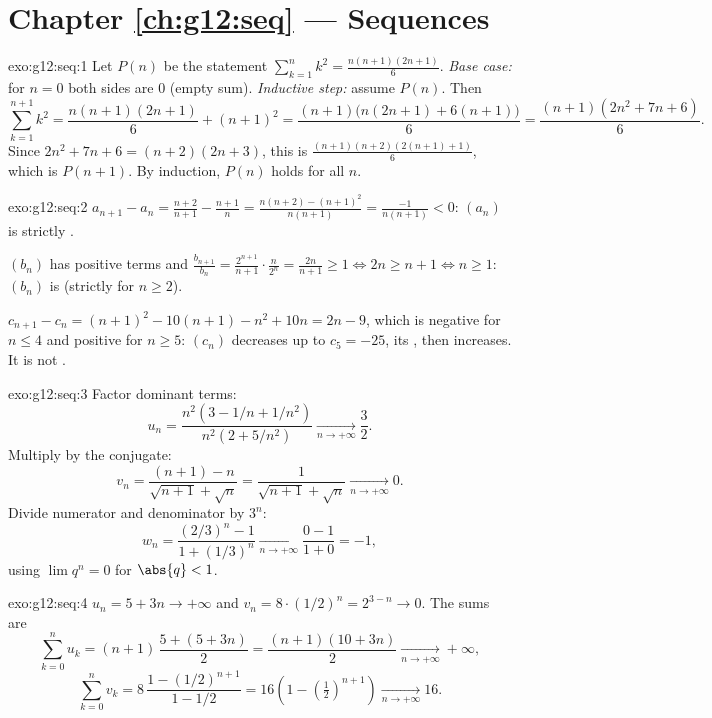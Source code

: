 \section*{Chapter \ref{ch:g12:seq} --- Sequences}

\begin{solution}{exo:g12:seq:1}
Let $P(n)$ be the statement $\sum_{k=1}^{n} k^2 = \frac{n(n+1)(2n+1)}{6}$.
\emph{Base case:} for $n = 0$ both sides are $0$ (empty sum).
\emph{Inductive step:} assume $P(n)$. Then
\[
\sum_{k=1}^{n+1} k^2 = \frac{n(n+1)(2n+1)}{6} + (n+1)^2
= \frac{(n+1)\bigl(n(2n+1) + 6(n+1)\bigr)}{6}
= \frac{(n+1)(2n^2 + 7n + 6)}{6}.
\]
Since $2n^2 + 7n + 6 = (n+2)(2n+3)$, this is
$\frac{(n+1)(n+2)(2(n+1)+1)}{6}$, which is $P(n+1)$. By induction, $P(n)$
holds for all $n$.
\end{solution}

\begin{solution}{exo:g12:seq:2}
$a_{n+1} - a_n = \frac{n+2}{n+1} - \frac{n+1}{n}
= \frac{n(n+2) - (n+1)^2}{n(n+1)} = \frac{-1}{n(n+1)} < 0$: $(a_n)$ is
strictly .

$(b_n)$ has positive terms and
$\frac{b_{n+1}}{b_n} = \frac{2^{n+1}}{n+1}\cdot\frac{n}{2^n} =
\frac{2n}{n+1} \geq 1 \iff 2n \geq n+1 \iff n \geq 1$: $(b_n)$ is 
(strictly for $n \geq 2$).

$c_{n+1} - c_n = (n+1)^2 - 10(n+1) - n^2 + 10n = 2n - 9$, which is negative
for $n \leq 4$ and positive for $n \geq 5$: $(c_n)$ decreases up to
$c_5 = -25$, its , then increases. It is not .
\end{solution}

\begin{solution}{exo:g12:seq:3}
Factor dominant terms:
\[
u_n = \frac{n^2(3 - 1/n + 1/n^2)}{n^2(2 + 5/n^2)} \xrightarrow[n\to+\infty]{} \frac{3}{2}.
\]
Multiply by the conjugate:
\[
v_n = \frac{(n+1) - n}{\sqrt{n+1} + \sqrt{n}} = \frac{1}{\sqrt{n+1}+\sqrt{n}}
\xrightarrow[n\to+\infty]{} 0.
\]
Divide numerator and denominator by $3^n$:
\[
w_n = \frac{(2/3)^n - 1}{1 + (1/3)^n} \xrightarrow[n\to+\infty]{} \frac{0-1}{1+0} = -1,
\]
using $\lim q^n = 0$ for $\abs{q} < 1$.
\end{solution}

\begin{solution}{exo:g12:seq:4}
$u_n = 5 + 3n \to +\infty$ and $v_n = 8 \cdot (1/2)^n = 2^{3-n} \to 0$.
The sums are
\[
\sum_{k=0}^{n} u_k = (n+1)\,\frac{5 + (5+3n)}{2} = \frac{(n+1)(10+3n)}{2}
\xrightarrow[n\to+\infty]{} +\infty,
\]
\[
\sum_{k=0}^{n} v_k = 8\,\frac{1 - (1/2)^{n+1}}{1 - 1/2}
= 16\left(1 - \left(\tfrac{1}{2}\right)^{n+1}\right)
\xrightarrow[n\to+\infty]{} 16 .
\]
\end{solution}

